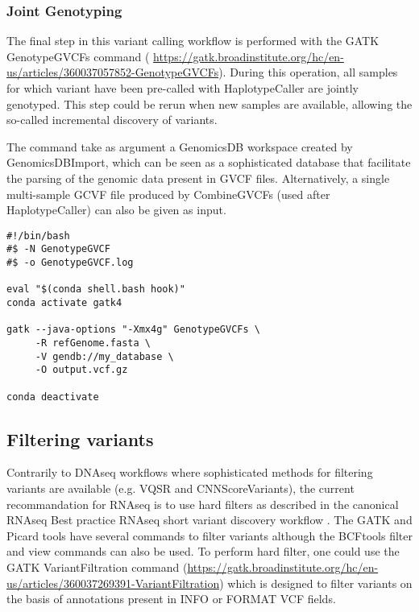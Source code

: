 \subsubsection{Joint Genotyping}

The final step in this variant calling workflow is performed with the GATK GenotypeGVCFs command (  \href{https://gatk.broadinstitute.org/hc/en-us/articles/360037057852-GenotypeGVCFs}{https://gatk.broadinstitute.org/hc/en-us/articles/360037057852-GenotypeGVCFs}). During this operation, all samples for which variant have been pre-called with HaplotypeCaller are jointly genotyped. This step could be rerun when new samples are available, allowing the so-called incremental discovery of variants.


The command take as argument a GenomicsDB workspace created by GenomicsDBImport, which can be seen as a sophisticated database that facilitate the parsing of the genomic data present in GVCF files. Alternatively, a single multi-sample GCVF file produced by CombineGVCFs (used after HaplotypeCaller) can also be given as input.

\begin{verbatim}
#!/bin/bash
#$ -N GenotypeGVCF
#$ -o GenotypeGVCF.log

eval "$(conda shell.bash hook)"
conda activate gatk4

gatk --java-options "-Xmx4g" GenotypeGVCFs \
	 -R refGenome.fasta \
	 -V gendb://my_database \
	 -O output.vcf.gz

conda deactivate
\end{verbatim}









\subsection{Filtering variants}


Contrarily to DNAseq workflows where sophisticated methods for filtering variants are available (e.g. VQSR and CNNScoreVariants), the current recommandation for RNAseq is to use hard filters as described in the canonical RNAseq Best practice RNAseq short variant discovery workflow \cite{GATK_RNAseq_variant_discovery}. The GATK and Picard tools have several commands to filter variants although the BCFtools filter and view commands can also be used. To perform hard filter, one could use the GATK VariantFiltration command  (\href{https://gatk.broadinstitute.org/hc/en-us/articles/360037269391-VariantFiltration}{https://gatk.broadinstitute.org/hc/en-us/articles/360037269391-VariantFiltration}) which is designed to filter variants on the basis of annotations present in INFO or FORMAT VCF fields.

